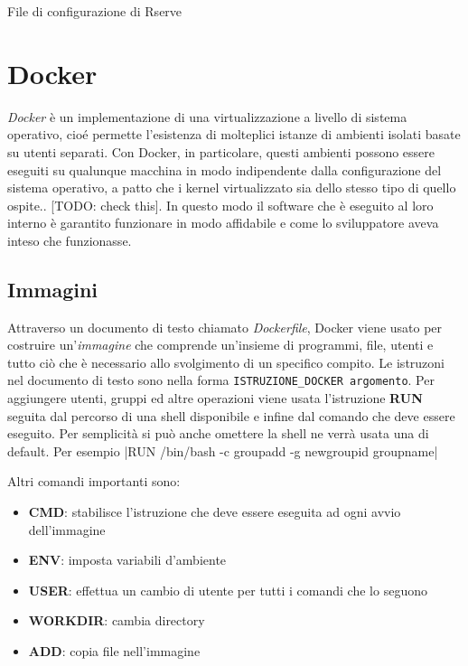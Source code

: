 \documentclass[10pt,titlepage,twoside,a4paper]{report}
\newenvironment{code}{\singlespacing\captionsetup{type=listing}}{}
\begin{document}
\begin{code}
    \caption{File di configurazione di Rserve}
    \label{lst:rservconf}
\end{code}


    \section{Docker}
\emph{Docker} è un implementazione di una virtualizzazione a 
livello di sistema operativo, cioé permette l'esistenza di molteplici istanze 
di ambienti isolati basate su utenti separati. Con Docker, in particolare, 
questi ambienti possono essere eseguiti su qualunque macchina in modo 
indipendente dalla configurazione del sistema operativo, a patto che i 
kernel virtualizzato sia dello stesso tipo di quello ospite.. [TODO: check 
this]. In 
questo modo il software che è eseguito al loro interno è garantito funzionare 
in modo affidabile e come lo sviluppatore aveva inteso che funzionasse.
\cite{operatingSystemLevelVirtualization} \cite{docker}

        \subsection{Immagini}
Attraverso un documento di testo chiamato \emph{Dockerfile}, Docker viene 
usato per costruire un'\emph{immagine} che comprende un'insieme di 
programmi, file, utenti e tutto ciò che è necessario allo svolgimento di
un specifico compito. Le istruzoni nel documento di testo sono nella forma
\texttt{ISTRUZIONE_DOCKER argomento}. Per aggiungere utenti, 
gruppi ed altre operazioni viene usata l'istruzione \textbf{RUN} seguita dal 
percorso di una shell disponibile e infine dal comando che deve essere eseguito. Per 
semplicità si può anche omettere la shell ne verrà usata una di default. Per 
esempio
|RUN /bin/bash -c groupadd -g newgroupid groupname|

Altri comandi importanti sono:
\begin{itemize}
    \item \textbf{CMD}: stabilisce l'istruzione che deve essere 
eseguita ad ogni avvio dell'immagine
    \item \textbf{ENV}: imposta variabili d'ambiente
    \item \textbf{USER}: effettua un cambio di utente per tutti i comandi che lo seguono
    \item \textbf{WORKDIR}: cambia directory
    \item \textbf{ADD}: copia file nell'immagine
\end{itemize}
\end{document}
